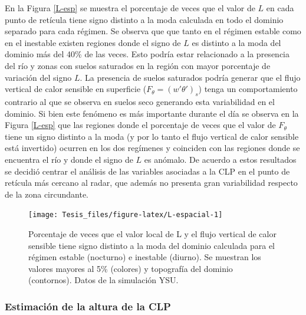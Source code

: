 \documentclass[12pt,spanish,oneside, a4paper]{book}
\begin{document}
En la Figura \ref{L-esp} se muestra el porcentaje de veces que el valor
de \(L\) en cada punto de retícula tiene signo distinto a la moda
calculada en todo el dominio separado para cada régimen. Se observa que
que tanto en el régimen estable como en el inestable existen regiones
donde el signo de \(L\) es distinto a la moda del dominio más del 40\%
de las veces. Esto podría estar relacionado a la presencia del río y
zonas con suelos saturados en la región con mayor porcentaje de
variación del signo \(L\). La presencia de suelos saturados podría
generar que el flujo vertical de calor sensible en superficie
(\(F_{\theta} = (w'\theta ')_s\)) tenga un comportamiento contrario al
que se observa en suelos seco generando esta variabilidad en el dominio.
Si bien este fenómeno es más importante durante el día se observa en la
Figura \ref{L-esp} que las regiones donde el porcentaje de veces que el
valor de \(F_{\theta}\) tiene un signo distinto a la moda (y por lo
tanto el flujo vertical de calor sensible está invertido) ocurren en los
dos regímenes y coinciden con las regiones donde se encuentra el río y
donde el signo de \(L\) es anómalo. De acuerdo a estos resultados se
decidió centrar el análisis de las variables asociadas a la CLP en el
punto de retícula más cercano al radar, que además no presenta gran
variabilidad respecto de la zona circundante.

\begin{figure}

{\centering \texttt{[image: Tesis\_files/figure-latex/L-espacial-1]} 

}

\caption{Porcentaje de veces que el valor local de L y el flujo vertical de calor sensible tiene signo distinto a la moda del dominio calculada para el régimen estable (nocturno) e inestable (diurno). Se muestran los valores mayores al 5\% (colores) y topografía del dominio (contornos). Datos de la simulación YSU. \label{L-esp}}\label{fig:L-espacial}
\end{figure}

\subsubsection{Estimación de la altura de la
CLP}\label{estimacion-de-la-altura-de-la-clp}
\end{document}

